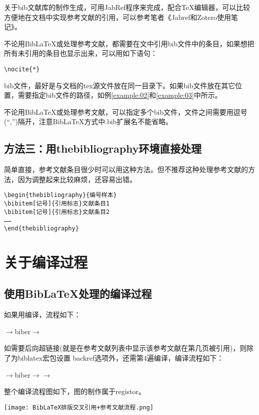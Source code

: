 \documentclass[cn,hazy,blue,14pt,geye,normal,]{elegantnote}
\begin{document}
\begin{note}
	关于bib文献库的制作生成，可用JabRef程序来完成，配合\TeX{}编辑器，可以比较方便地在文档中实现参考文献的引用，可以参考笔者《Jabref和Zotero使用笔记》\cite{zalois20200424}。
\end{note}
\begin{note}
	不论用Bib\LaTeX{}或\BibTeX{}处理参考文献，都需要在文中引用bib文件中的条目，如果想把所有未引用的条目也显示出来，可以用如下语句：
\begin{lstlisting}
\nocite{*}
\end{lstlisting}
\end{note}
\begin{note}
	bib文件，最好是与文档的tex源文件放在同一目录下。如果bib文件放在其它位置，需要指定bib文件的路径，如例\ref{example:02}和\ref{example:03}中所示。
\end{note}
\begin{note}
	不论用Bib\LaTeX{}或\BibTeX{}处理参考文献，可以指定多个bib文件，文件之间需要用逗号(``,'')隔开，注意Bib\LaTeX{}方式中.bib扩展名不能省略。
\end{note}
\subsection{方法三：用thebibliography环境直接处理}
简单直接，参考文献条目很少时可以用这种方法。但不推荐这种处理参考文献的方法，因为调整起来比较麻烦，还容易出错。
\begin{lstlisting}
\begin{thebibliography}{编号样本}
\bibitem[记号]{引用标志}文献条目1
\bibitem[记号]{引用标志}文献条目2
……
\end{thebibliography}
\end{lstlisting}
\section{关于编译过程}
\subsection{使用Bib\LaTeX{}处理的编译过程}
如果用\XeLaTeX{}编译，流程如下：\par
\XeLaTeX\(\to\)biber\(\to\)\XeLaTeX\par
如需要后向超链接(就是在参考文献列表中显示该参考文献在第几页被引用)，则除了为biblatex宏包设置 backref选项外，还需第4遍\XeLaTeX{}编译，编译流程如下：\par
\XeLaTeX\(\to\)biber\(\to\)\XeLaTeX\(\to\)\XeLaTeX\par
整个编译流程图如下，图的制作属于registor\cite{registor20190923}。\par
\texttt{[image: BibLaTeX排版交叉引用+参考文献流程.png]}
\end{document}
